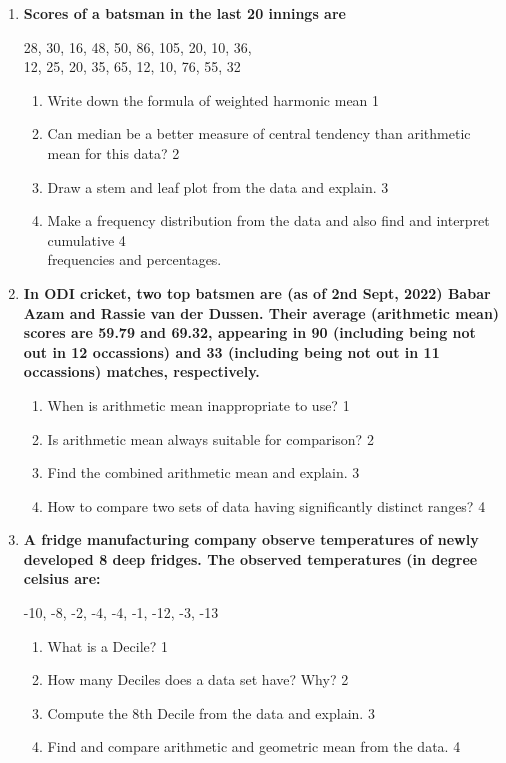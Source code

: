 \documentclass[a4paper,oneside]{book}
\begin{document}
\begin{enumerate}
      \item
  \textbf{Scores of a batsman in the last 20 innings are} 
   \begin{center}
  	 28, 30, 16, 48, 50, 86, 105, 20, 10, 36, \\
  	 12, 25, 20, 35, 65, 12, 10, 76, 55, 32
  	 \end{center}
  \begin{enumerate}
    \item
	Write down the formula of weighted harmonic mean \hfill 1
    \item
	Can median be a better measure of central tendency than arithmetic mean for this data?  \hfill 2
    \item  
	Draw a stem and leaf plot from the data and explain.  \hfill 3
    \item
	Make a frequency distribution from the data and also find and interpret cumulative  \hfill 4 \\ frequencies and percentages.
\end{enumerate}

 \item
	  \textbf{In ODI cricket, two top batsmen are (as of 2nd Sept, 2022) Babar Azam and Rassie van der Dussen. Their average (arithmetic mean) scores are 59.79 and 69.32, appearing in 90 (including being not out in 12 occassions) and 33 (including being not out in 11 occassions) matches, respectively.} 
  
  \begin{enumerate}
    \item
	When is arithmetic mean inappropriate to use? \hfill 1
    \item
	Is arithmetic mean always suitable for comparison? \hfill 2
    \item  
	Find the combined arithmetic mean and explain. \hfill 3
    \item
	How to compare two sets of data having significantly distinct ranges? \hfill 4
  \end{enumerate}
  
   \item
	  \textbf{A fridge manufacturing company observe temperatures of newly developed 8 deep fridges. The observed temperatures (in degree celsius are:} 
	  
	    \begin{center}
-10, -8, -2, -4, -4, -1, -12, -3, -13
  \end{center}
  
  \begin{enumerate}
    \item
	What is a Decile? \hfill 1
    \item
	How many Deciles does a data set have? Why? \hfill 2
    \item  
	Compute the 8th Decile from the data and explain. \hfill 3
    \item
	Find and compare arithmetic and geometric mean from the data. \hfill 4
  \end{enumerate}
  

\end{enumerate}
\end{document}
